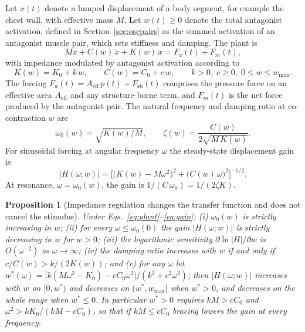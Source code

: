 \documentclass[11pt]{article}
\theoremstyle{plain}
\newtheorem{proposition}{Proposition}
\theoremstyle{definition}
\begin{document}
Let $x(t)$ denote a lumped displacement of a body segment, for example the chest wall, with effective mass $M$. Let $w(t)\ge 0$ denote the total antagonist activation, defined in Section~\ref{sec:oscpairs} as the summed activation of an antagonist muscle pair, which sets stiffness and damping. The plant is
\begin{equation}
M\ddot{x} + C(w)\,\dot{x} + K(w)\,x = F_a(t) + F_m(t),
\label{eq:plant}
\end{equation}
with impedance modulated by antagonist activation according to
\begin{equation}
K(w) = K_0 + k\,w, \qquad C(w) = C_0 + c\,w, \qquad k>0,\; c\ge 0,\; 0\le w\le w_{\max}.
\label{eq:impedance}
\end{equation}
The forcing $F_a(t)=A_{\mathrm{eff}}\,p(t) + F_{\mathrm{sb}}(t)$ comprises the pressure force on an effective area $A_{\mathrm{eff}}$ and any structure-borne term, and $F_m(t)$ is the net force produced by the antagonist pair. The natural frequency and damping ratio at co-contraction $w$ are
\begin{equation}
\omega_0(w)=\sqrt{K(w)/M}, \qquad \zeta(w)=\frac{C(w)}{2\sqrt{M\,K(w)}}.
\label{eq:modal}
\end{equation}
For sinusoidal forcing at angular frequency $\omega$ the steady-state displacement gain is
\begin{equation}
|H(\omega;w)| = \Big[\big(K(w)-M\omega^2\big)^2 + \big(C(w)\,\omega\big)^2\Big]^{-1/2}.
\label{eq:gain}
\end{equation}
At resonance, $\omega=\omega_0(w)$, the gain is $1/(C\,\omega_0) = 1/(2\zeta K)$.

\begin{proposition}[Impedance regulation changes the transfer function and does not cancel the stimulus]
\label{prop:impedance}
Under Eqs.~\eqref{eq:plant}--\eqref{eq:gain}: (i) $\omega_0(w)$ is strictly increasing in $w$; (ii) for every $\omega\le\omega_0(0)$ the gain $|H(\omega;w)|$ is strictly decreasing in $w$ for $w>0$; (iii) the logarithmic sensitivity $\partial\ln|H|/\partial w$ is $O(\omega^{-2})$ as $\omega\to\infty$; (iv) the damping ratio increases with $w$ if and only if $c/C(w) > k/(2K(w))$; and (v) for any $\omega$ let $w^{\ast}(\omega)=\big[k(M\omega^2-K_0)-cC_0\omega^2\big]/(k^2+c^2\omega^2)$; then $|H(\omega;w)|$ increases with $w$ on $[0,w^{\ast})$ and decreases on $(w^{\ast},w_{\max}]$ when $w^{\ast}>0$, and decreases on the whole range when $w^{\ast}\le 0$. In particular $w^{\ast}>0$ requires $kM>cC_0$ and $\omega^2>kK_0/(kM-cC_0)$, so that if $kM\le cC_0$ bracing lowers the gain at every frequency.
\end{proposition}
\end{document}

